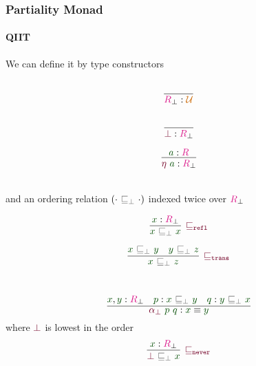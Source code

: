 \documentclass[xelatex,mathserif,serif,notheorems]{beamer} %
\theoremstyle{plain} %
\theoremstyle{definition}
\theoremstyle{remark}
\newcommand*{\term}[1]{\textcolor{green!30!black}{#1}} %
\newcommand*{\type}[1]{\textcolor{magenta!90!black}{#1}}
\newcommand*{\universe}[1]{\textcolor{orange!80!black}{#1}}
\newcommand*{\relation}[1]{\textcolor{gray!75!black}{\ensuremath{\mathtt{#1}}}}
\newcommand*{\constructor}[1]{\textcolor{purple!60!black}{\ensuremath{\mathtt{#1}}}}
\begin{document}
\begin{frame}
  \frametitle{Partiality Monad}
  \framesubtitle{QIIT}
  We can define it by type constructors\\[-4mm]
  \strut
  \hfill
  \begin{minipage}{0.25\linewidth}
    \begin{equation}
      \vcenter{\infer{\type{R}_\bot : \universe{\mathcal{U}}}{\strut}}
    \end{equation}
  \end{minipage}
  \hfill
  \begin{minipage}{0.25\linewidth}
    \begin{equation}
      \vcenter{\infer{\constructor{\bot} : \type{R}_\bot}{\strut}}
    \end{equation}
  \end{minipage}
  \hfill
  \begin{minipage}{0.25\linewidth}
    \begin{equation}
      \vcenter{\infer{\constructor{\eta}~\term{a} : \type{R}_\bot}{\term{a} : \type{R}}}
    \end{equation}
  \end{minipage}
  \hfill
  \strut
  \\[3mm]
  and an ordering relation \((\cdot~\relation{\sqsubseteq_{\bot}}~\cdot)\) indexed twice over \(\type{R}_\bot\) \\
  \strut
  \hfill
  \begin{minipage}{0.3\linewidth}
    \begin{equation}
      \vcenter{\infer[\constructor{\sqsubseteq_{refl}}]{\term{x}~\relation{\sqsubseteq_{\bot}}~\term{x}}{\term{x} : \type{R}_\bot}}
    \end{equation}
  \end{minipage}
  \hfill
  \begin{minipage}{0.45\linewidth}
    \begin{equation}
      \vcenter{\infer[\constructor{\sqsubseteq_{trans}}]{\term{x}~\relation{\sqsubseteq_{\bot}}~\term{z}}{\term{x}~\relation{\sqsubseteq_{\bot}}~\term{y} & \term{y}~\relation{\sqsubseteq_{\bot}}~\term{z}}}
    \end{equation}
  \end{minipage}
  \hfill
  \strut
  \\[4mm]
  \begin{equation}
    \vcenter{\infer{\constructor{\alpha_{\bot}}~\term{p}~\term{q} : \term{x} \equiv \term{y}}{\term{x},\term{y} : \type{R}_\bot & \term{p} : \term{x}~\relation{\sqsubseteq_{\bot}}~\term{y} & \term{q} : \term{y}~\relation{\sqsubseteq_{\bot}}~\term{x}}}
  \end{equation}
  where \(\constructor{\bot}\) is lowest in the order
  \begin{equation}
    \vcenter{\infer[\constructor{\sqsubseteq_{never}}]{\constructor{\bot}~\relation{\sqsubseteq_{\bot}}~\term{x}}{\term{x} : \type{R}_\bot}}
  \end{equation}
\end{frame}
\end{document}
